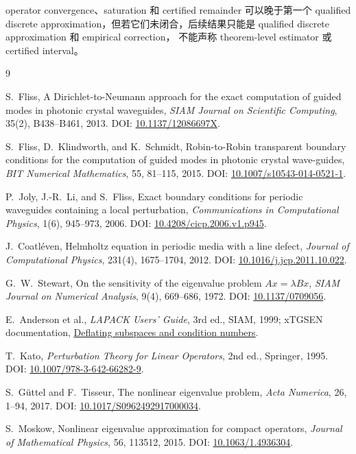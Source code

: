 \documentclass[UTF8,fontset=fandol,11pt,a4paper]{ctexart}
\begin{document}
operator convergence、saturation 和 certified remainder 可以晚于第一个 qualified discrete
approximation，但若它们未闭合，后续结果只能是 qualified discrete approximation 和
empirical correction，
不能声称 theorem-level estimator 或 certified interval。

\begin{thebibliography}{9}

S.~Fliss,
\newblock A Dirichlet-to-Neumann approach for the exact computation of guided modes in photonic crystal waveguides,
\newblock \emph{SIAM Journal on Scientific Computing}, 35(2), B438--B461, 2013.
\newblock DOI: \href{https://doi.org/10.1137/12086697X}{10.1137/12086697X}.

S.~Fliss, D.~Klindworth, and K.~Schmidt,
\newblock Robin-to-Robin transparent boundary conditions for the computation of guided modes in photonic crystal wave-guides,
\newblock \emph{BIT Numerical Mathematics}, 55, 81--115, 2015.
\newblock DOI: \href{https://doi.org/10.1007/s10543-014-0521-1}{10.1007/s10543-014-0521-1}.

P.~Joly, J.-R.~Li, and S.~Fliss,
\newblock Exact boundary conditions for periodic waveguides containing a local perturbation,
\newblock \emph{Communications in Computational Physics}, 1(6), 945--973, 2006.
\newblock DOI: \href{https://doi.org/10.4208/cicp.2006.v1.p945}{10.4208/cicp.2006.v1.p945}.

J.~Coatl\'even,
\newblock Helmholtz equation in periodic media with a line defect,
\newblock \emph{Journal of Computational Physics}, 231(4), 1675--1704, 2012.
\newblock DOI: \href{https://doi.org/10.1016/j.jcp.2011.10.022}{10.1016/j.jcp.2011.10.022}.

G.~W.~Stewart,
\newblock On the sensitivity of the eigenvalue problem $Ax=\lambda Bx$,
\newblock \emph{SIAM Journal on Numerical Analysis}, 9(4), 669--686, 1972.
\newblock DOI: \href{https://doi.org/10.1137/0709056}{10.1137/0709056}.

E.~Anderson et al.,
\newblock \emph{LAPACK Users' Guide}, 3rd ed., SIAM, 1999; xTGSEN documentation,
\newblock \href{https://www.netlib.org/lapack/lug/node58.html}{Deflating subspaces and condition numbers}.

T.~Kato,
\newblock \emph{Perturbation Theory for Linear Operators}, 2nd ed., Springer, 1995.
\newblock DOI: \href{https://doi.org/10.1007/978-3-642-66282-9}{10.1007/978-3-642-66282-9}.

S.~G\"uttel and F.~Tisseur,
\newblock The nonlinear eigenvalue problem,
\newblock \emph{Acta Numerica}, 26, 1--94, 2017.
\newblock DOI: \href{https://doi.org/10.1017/S0962492917000034}{10.1017/S0962492917000034}.

S.~Moskow,
\newblock Nonlinear eigenvalue approximation for compact operators,
\newblock \emph{Journal of Mathematical Physics}, 56, 113512, 2015.
\newblock DOI: \href{https://doi.org/10.1063/1.4936304}{10.1063/1.4936304}.

\end{thebibliography}
\end{document}
